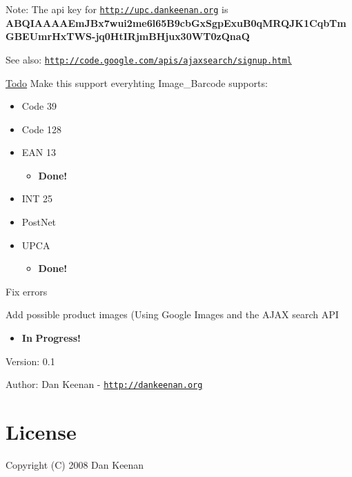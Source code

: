 \begin{Desc}
\item[Note:]The api key for \href{http://upc.dankeenan.org}{\tt http://upc.dankeenan.org} is {\bf ABQIAAAAEmJBx7wui2me6l65B9cbGxSgpExuB0qMRQJK1CqbTmGBEUmrHxTWS-jq0HtIRjmBHjux30WT0zQnaQ} \end{Desc}
\begin{Desc}
\item[See also:]\href{http://code.google.com/apis/ajaxsearch/signup.html}{\tt http://code.google.com/apis/ajaxsearch/signup.html} \end{Desc}
\begin{Desc}
\item[\hyperlink{todo__todo000001}{Todo}]Make this support everyhting Image\_\-Barcode supports:\begin{itemize}
\item Code 39\item Code 128\item EAN 13\begin{itemize}
\item {\bf Done!} \end{itemize}
\item INT 25\item PostNet\item UPCA\begin{itemize}
\item {\bf Done!} \end{itemize}
\end{itemize}


Fix errors 

Add possible product images (Using Google Images and the AJAX search API\begin{itemize}
\item {\bf In} {\bf Progress!} \end{itemize}
\end{Desc}
\begin{Desc}
\item[Version:]0.1 \end{Desc}
\begin{Desc}
\item[Author:]Dan Keenan - \href{http://dankeenan.org}{\tt http://dankeenan.org} \end{Desc}
\hypertarget{index_license}{}\section{License}\label{index_license}
Copyright (C) 2008 Dan Keenan

